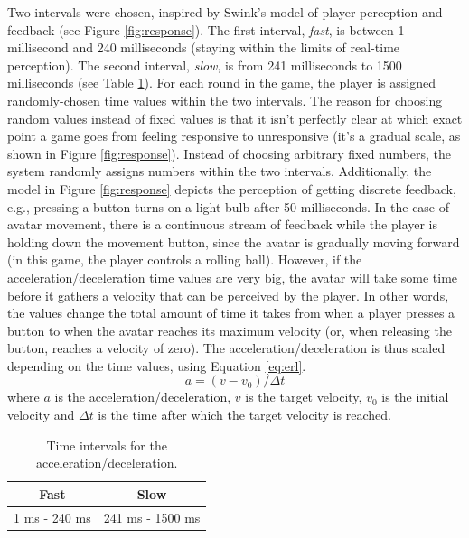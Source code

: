 Two intervals were chosen, inspired by Swink's model of player perception and feedback (see Figure \ref{fig:response}). The first interval, \textit{fast}, is between 1 millisecond and 240 milliseconds (staying within the limits of real-time perception). The second interval, \textit{slow}, is from 241 milliseconds to 1500 milliseconds (see Table \ref{tab:time}). For each round in the game, the player is assigned randomly-chosen time values within the two intervals. The reason for choosing random values instead of fixed values is that it isn't perfectly clear at which exact point a game goes from feeling responsive to unresponsive (it's a gradual scale, as shown in Figure \ref{fig:response}). Instead of choosing arbitrary fixed numbers, the system randomly assigns numbers within the two intervals. Additionally, the model in Figure \ref{fig:response} depicts the perception of getting discrete feedback, e.g., pressing a button turns on a light bulb after 50 milliseconds. In the case of avatar movement, there is a continuous stream of feedback while the player is holding down the movement button, since the avatar is gradually moving forward (in this game, the player controls a rolling ball). However, if the acceleration/deceleration time values are very big, the avatar will take some time before it gathers a velocity that can be perceived by the player. In other words, the values change the total amount of time it takes from when a player presses a button to when the avatar reaches its maximum velocity (or, when releasing the button, reaches a velocity of zero). The acceleration/deceleration is thus scaled depending on the time values, using Equation \ref{eq:erl}.
\begin{equation} \label{eq:erl} %
a = (v - v_0)/{\Delta}t
\end{equation} 
where $a$ is the acceleration/deceleration, $v$ is the target velocity, $v_0$ is the initial velocity and ${\Delta}t$ is the time after which the target velocity is reached.

\begin{table} \centering
\label{tab:time}
\caption{Time intervals for the acceleration/deceleration.}
\begin{tabular}{cc}
\toprule
\textbf{Fast} & \textbf{Slow} \\
\midrule
1 ms - 240 ms & 241 ms - 1500 ms\\
\bottomrule
\end{tabular}
\end{table}

